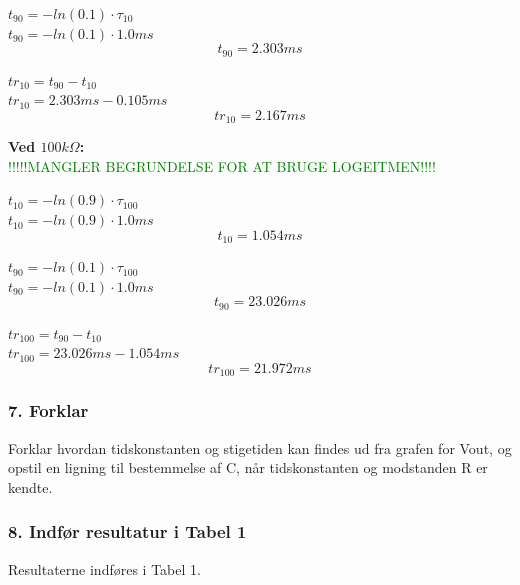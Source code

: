 \begin{center}
$t_{90}=-ln(0.1)\cdot \tau_{10}$\\
$t_{90}=-ln(0.1)\cdot 1.0 ms$
\begin{equation}
t_{90}= 2.303 ms
\label{t_10_90}
\end{equation}
\end{center}


\begin{center}
$tr_{10}=t_{90} - t_{10}$\\
$tr_{10}=2.303 ms - 0.105 ms$
\begin{equation}
tr_{10}= 2.167 ms
\label{tr_10}
\end{equation}
\end{center}


\textbf{Ved $100k\Omega$:}\\
\textcolor{green}{!!!!!MANGLER BEGRUNDELSE FOR AT BRUGE LOGEITMEN!!!!}
\begin{center}
$t_{10}=-ln(0.9)\cdot \tau_{100}$\\
$t_{10}=-ln(0.9)\cdot 1.0 ms$
\begin{equation}
t_{10}= 1.054 ms
\label{t_100_10}
\end{equation}
\end{center}


\begin{center}
$t_{90}=-ln(0.1)\cdot \tau_{100}$\\
$t_{90}=-ln(0.1)\cdot 1.0 ms$
\begin{equation}
t_{90}= 23.026 ms
\label{t_100_90}
\end{equation}
\end{center}


\begin{center}
$tr_{100}=t_{90} - t_{10}$\\
$tr_{100}=23.026 ms - 1.054 ms$
\begin{equation}
tr_{100}= 21.972 ms
\label{tr_100}
\end{equation}
\end{center}
 

\subsubsection*{7. Forklar}
Forklar hvordan tidskonstanten og stigetiden kan findes ud fra grafen for 	Vout, og opstil en ligning til bestemmelse af C, når tidskonstanten %
 og modstanden R er kendte.

\subsubsection*{8. Indfør resultatur i Tabel 1}
Resultaterne indføres i Tabel 1.





